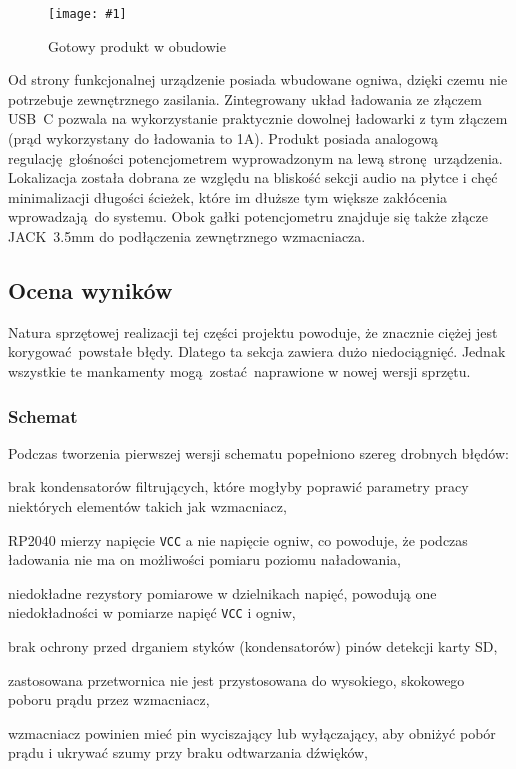 \documentclass[12pt]{report}
\let\tempone\itemize
\let\temptwo\enditemize
\renewenvironment{itemize}{\tempone\setlength{\itemsep}{0cm}}{\temptwo}
\newcommand{\imgint}[4]{
	\begin{figure}[{#4}]
		\centering
		\texttt{[image: \#1]}
		\caption{#2}
		\label{#1}
	\end{figure}
}
\newcommand{\imgh}[3]{\imgint{#1}{#2}{#3}{H}}
\begin{document}
		\imgh{5/hw_result}{Gotowy produkt w obudowie}{0.7}
		
		Od strony funkcjonalnej urządzenie posiada wbudowane ogniwa, dzięki czemu nie potrzebuje zewnętrznego zasilania. Zintegrowany układ ładowania ze złączem USB~C pozwala na wykorzystanie praktycznie dowolnej ładowarki z tym złączem (prąd wykorzystany do ładowania to 1A). Produkt posiada analogową regulację głośności potencjometrem wyprowadzonym na lewą stronę urządzenia. Lokalizacja została dobrana ze względu na bliskość sekcji audio na płytce i chęć minimalizacji długości ścieżek, które im dłuższe tym większe zakłócenia wprowadzają do systemu. Obok gałki potencjometru znajduje się także złącze JACK~3.5mm do podłączenia zewnętrznego wzmacniacza.
		
		\subsection{Ocena wyników}
			Natura sprzętowej realizacji tej części projektu powoduje, że znacznie ciężej jest korygować powstałe błędy. Dlatego ta sekcja zawiera dużo niedociągnięć. Jednak wszystkie te mankamenty mogą zostać naprawione w nowej wersji sprzętu.
			
			\subsubsection{Schemat}
				\noindent
				Podczas tworzenia pierwszej wersji schematu popełniono szereg drobnych błędów:
				\begin{itemize}
					\item brak kondensatorów filtrujących, które mogłyby poprawić parametry pracy niektórych elementów takich jak wzmacniacz,
					\item RP2040 mierzy napięcie \lstinline|VCC| a nie napięcie ogniw, co powoduje, że podczas ładowania nie ma on możliwości pomiaru poziomu naładowania,
					\item niedokładne rezystory pomiarowe w dzielnikach napięć, powodują one niedokładności w pomiarze napięć \lstinline|VCC| i ogniw,
					\item brak ochrony przed drganiem styków (kondensatorów) pinów detekcji karty SD,
					\item zastosowana przetwornica nie jest przystosowana do wysokiego, skokowego poboru prądu przez wzmacniacz,
					\item wzmacniacz powinien mieć pin wyciszający lub wyłączający, aby obniżyć pobór prądu i ukrywać szumy przy braku odtwarzania dźwięków,
				\end{itemize}
				
\end{document}
